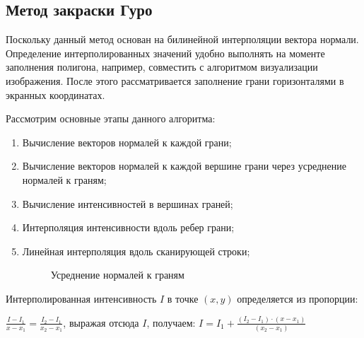 \documentclass[a4paper,14pt]{extreport}
\begin{document}
		\subsection{Метод закраски Гуро}
		Поскольку данный метод основан на билинейной интерполяции вектора
нормали. Определение интерполированных значений удобно выполнять на
моменте заполнения полигона, например, совместить с алгоритмом
визуализации изображения. После этого рассматривается заполнение грани
горизонталями в экранных координатах.
		\par Рассмотрим основные этапы данного алгоритма:
		\begin{enumerate}
\item Вычисление векторов нормалей к каждой грани;
\item Вычисление векторов нормалей к каждой вершине грани через
усреднение нормалей к граням;
\item Вычисление интенсивностей в вершинах граней;
\item Интерполяция интенсивности вдоль ребер грани;
\item Линейная интерполяция вдоль сканирующей строки;
	\begin{figure}[H]
		\caption{Усреднение нормалей к граням}
		\label{ris:image}
	\end{figure}
\end{enumerate}
\par Интерполированная интенсивность \begin{math}I\end{math} в точке \begin{math}(x, y) \end{math} определяется из пропорции:
\begin{center}
		\begin{math}
		\frac{
		I - I_1
  		}{
  		x - x_1
		} = \frac{
		I_2 - I_1
  		}{
  		x_2 - x_1
		}
		\end{math}, выражая отсюда 
		\begin{math}
		I
		\end{math}, получаем:
		\begin{math}
		I = I_1 + \frac{
		(I_2 - I_1) \cdot (x - x_1)
  		}{
  		(x_2 - x_1)
		} 
		\end{math}
\end{center}
\end{document}
